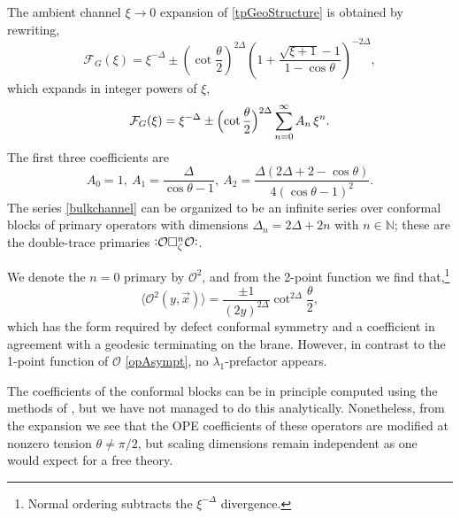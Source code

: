 \documentclass[reprint,amsmath,amssymb,aps,nofootinbib,twocolumn]{revtex4-2}
\newcommand{\normord}[1]{\xcentcolon\mathrel{#1}\xcentcolon}
\newcommand{\xcentcolon}{%
  \mathrel{\vbox{\hbox{$:$}\kern.2ex}}%
}
\begin{document}



The ambient channel $ \xi \rightarrow 0 $ expansion of \eqref{tpGeoStructure} is obtained by rewriting,
\begin{equation}
\mathcal{F}_G(\xi) = \xi^{-\Delta} \pm \left(\cot{\frac{\theta}{2}}\right)^{2\Delta}\left(1 + \frac{\sqrt{\xi+1}-1}{1-\cos{\theta}}\right)^{-2\Delta},
\end{equation}
which expands in integer powers of $ \xi $,
\begin{equation}
\mathcal{F}_G(\xi) = \xi^{-\Delta}\pm \Bigl(\cot{\frac{\theta}{2}}\Bigr)^{2\Delta}\sum_{n=0}^{\infty}A_n\, \xi^{n}.
\label{bulkchannel}
\end{equation}
The first three coefficients are
\begin{equation}
A_0 = 1,\ A_1 = \frac{\Delta}{\cos{\theta}-1},\ A_2 = \frac{\Delta(2\Delta+2-\cos{\theta})}{4(\cos{\theta}-1)^{2}}.
\end{equation}
The series \eqref{bulkchannel} can be organized to be an infinite series over conformal blocks of primary operators with dimensions $ \Delta_n = 2\Delta + 2n $ with $ n\in \mathbb{N} $; these are the double-trace primaries $\normord{\mathcal{O}\square^{n}_{\zeta}\mathcal{O}}$. 

We denote the $ n=0 $ primary by $ \mathcal{O}^{2} $, and from the 2-point function we find that,\footnote{Normal ordering subtracts the $ \xi^{-\Delta} $ divergence.}
\begin{equation}
\langle \mathcal{O}^{2}(y,\vec{x}) \rangle = \frac{\pm 1}{(2y)^{2\Delta}} \cot^{2\Delta}\frac{\theta}{2},
\end{equation}
which has the form required by defect conformal symmetry and a coefficient in agreement with a geodesic terminating on the brane. However, in contrast to the 1-point function of $ \mathcal{O} $ \eqref{opAsympt}, no $ \lambda_1 $-prefactor appears.

The coefficients of the conformal blocks can be in principle computed using the methods of \cite{hogervorst_crossing_2017,Hogervorst:2017kbj}, but we have not managed to do this analytically. Nonetheless, from the expansion we see that the OPE coefficients of these operators are modified at nonzero tension $ \theta \neq \pi/2 $, but scaling dimensions remain independent as one would expect for a free theory.
\end{document}

